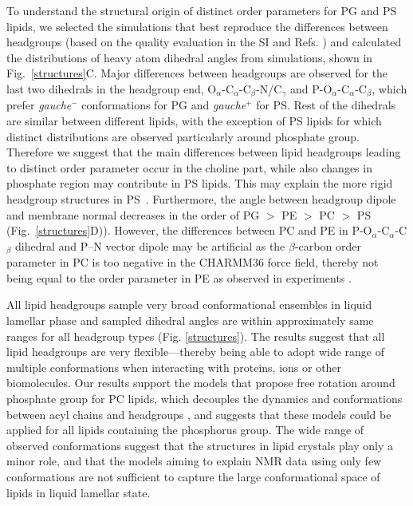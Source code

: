 \documentclass[aps,prl,superscriptaddress,twocolumn]{revtex4}
\begin{document}
To understand the structural origin of distinct order parameters for PG and PS lipids, we selected the simulations that best reproduce the differences between headgroups (based on the quality evaluation in the SI and Refs. \cite{botan15,antila19}) and calculated the distributions of heavy atom dihedral angles from simulations, shown in Fig.~\ref{structures}C. Major differences between headgroups are observed for the last two dihedrals in the headgroup end,  O$_\alpha$-C$_\alpha$-C$_\beta$-N/C$_\gamma$ and P-O$_\alpha$-C$_\alpha$-C$_\beta$, which prefer \textit{gauche$^-$} conformations for PG and \textit{gauche$^+$} for PS. Rest of the dihedrals are similar between different lipids, with the exception of PS lipids for which distinct distributions are observed particularly around phosphate group. Therefore we suggest that the main differences between lipid headgroups leading to distinct order parameter occur in the choline part, while also changes in phosphate region may contribute in PS lipids. This may explain the more rigid headgroup structures in PS~\cite{browning80,buldt81}. Furthermore, the angle between headgroup dipole and membrane normal decreases in the order of PG $>$ PE  $>$ PC  $>$ PS (Fig.~\ref{structures}D)). However, the differences between PC and PE in P-O$_\alpha$-C$_\alpha$-C$_\beta$ dihedral
and P--N vector dipole may be artificial as the $\beta$-carbon order parameter in PC is too negative in the CHARMM36 force field, thereby not being equal to the order parameter in PE as observed in experiments \cite{botan15}.

All lipid headgroups sample very broad conformational ensembles in liquid lamellar phase and sampled dihedral angles are within approximately same ranges for all headgroup types (Fig. \ref{structures}). The results suggest that all lipid headgroups are very flexible---thereby being able to adopt wide range of multiple conformations when interacting with proteins, ions or other biomolecules. Our results support the models that propose free rotation around phosphate group for PC lipids, which decouples the dynamics and conformations between acyl chains and headgroups \cite{klauda08c,antila21b}, and suggests that these models could be applied for all lipids containing the phosphorus group. The wide range of observed conformations suggest that the structures in lipid crystals \cite{buldt81,pascher92} play only a minor role, and that the models aiming to explain NMR data using only few conformations \cite{seelig77c,davis83,Semchyschyn04,akutsu20} are not sufficient to capture the large conformational space of lipids in liquid lamellar state.
\end{document}
